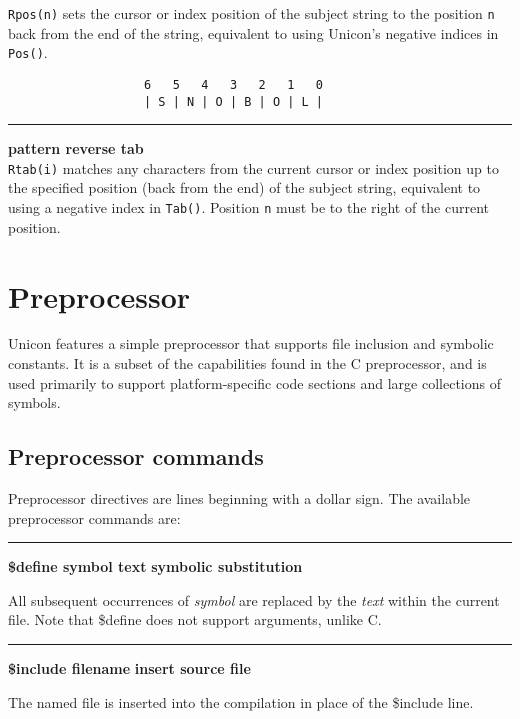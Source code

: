 \noindent
\texttt{Rpos(n)} sets the cursor or index position of the subject string to
the position \texttt{n} back from the end of the string, equivalent to
using Unicon's negative indices in \texttt{Pos()}.
\begin{verbatim}
                   6   5   4   3   2   1   0
                   | S | N | O | B | O | L |
\end{verbatim}


\bigskip\hrule\vspace{0.1cm}
 \hfill{\bf pattern reverse tab}\\

\noindent
\texttt{Rtab(i)} matches any characters from the current cursor or
index position up to 
the specified position (back from the end) of the subject string,
equivalent to using a negative index in \texttt{Tab()}.
Position \texttt{n} must be to the right of the current position.\\


\section{Preprocessor}

Unicon features a simple preprocessor that supports file
inclusion and symbolic constants. It is a subset of the capabilities found in
the C preprocessor, and is used primarily to support platform-specific code
sections and large collections of symbols.

\subsection*{Preprocessor commands}

Preprocessor directives are lines beginning with a dollar sign. The
available preprocessor commands are:

\bigskip\hrule\vspace{0.1cm}
\noindent
{\bf \$define symbol text } \hfill {\bf symbolic substitution}

\noindent
{}All subsequent occurrences of \textit{symbol} are
replaced by the \textit{text} within the current file. Note that
\$define does not support arguments, unlike C.

\bigskip\hrule\vspace{0.1cm}
\noindent
{\bf \$include filename } \hfill {\bf insert source file}

\noindent
{}The named file is inserted into the compilation in place
of the \$include line.

